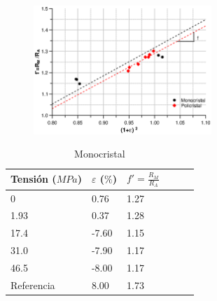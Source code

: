 \documentclass[usenames,dvipsnames]{beamer}
\begin{document}

\begin{frame}
 
 \begin{figure}
 \includegraphics[width=0.6\textwidth]{img/resistencia/PoliMono2.eps}
 \end{figure}

 \begin{multicols}{2}
 
\begin{table} 
\tiny
\begin{tabular}{@{}llllll@{}} \toprule
Tensión ($MPa$) & $\varepsilon$ ($\%$) &  $f'=\frac{R_M}{R_A}$\\ \midrule
 0        &  0.76   & 1.27\\
 1.93       &  0.37   & 1.28\\
 17.4      &  -7.60  & 1.15\\
 31.0      &  -7.90  & 1.17\\
 46.5     &  -8.00  & 1.17  \\
 Referencia    & 8.00  &  1.73   \\
 \bottomrule
\end{tabular}
 \caption{Monocristal}
\end{table}


\end{multicols}
\end{frame}
\end{document}
